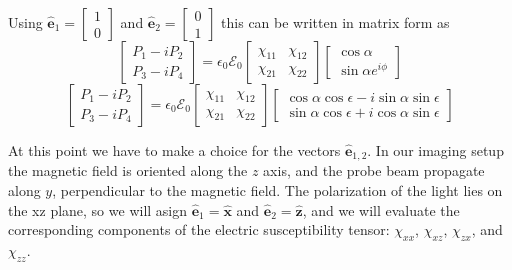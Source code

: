 \documentclass[11pt,letter]{article}
\newcommand{\bv}[1]{\ensuremath{\bm{#1}}}
\newcommand{\efieldo}{\ensuremath{\mathcal{E}_{0}}}
\begin{document}
Using  
$\bv{\hat{e}}_{1} = \left[ \begin{smallmatrix}  1 \\ 0 \end{smallmatrix} \right]$
and 
$\bv{\hat{e}}_{2} = \left[ \begin{smallmatrix}  0 \\ 1 \end{smallmatrix} \right]$
this can be written in matrix form as 
\begin{equation}
 \left[ \begin{matrix}  P_{1}-iP_{2} \\ P_{3}-iP_{4} \end{matrix} \right]
  =  \epsilon_{0}\efieldo 
 \left[ \begin{matrix}
     \chi_{11} & \chi_{12} \\ \chi_{21} & \chi_{22} 
 \end{matrix} \right]
 \left[ \begin{matrix}
      \cos\alpha \\
      \sin\alpha e^{i\phi}
 \end{matrix} \right]
\end{equation}
\begin{equation}
 \left[ \begin{matrix}  P_{1}-iP_{2} \\ P_{3}-iP_{4} \end{matrix} \right]
  =  \epsilon_{0}\efieldo 
 \left[ \begin{matrix}
     \chi_{11} & \chi_{12} \\ \chi_{21} & \chi_{22} 
 \end{matrix} \right]
 \left[ \begin{matrix}
      \cos\alpha \cos \epsilon - i \sin\alpha\sin\epsilon \\
      \sin\alpha \cos\epsilon + i \cos\alpha\sin\epsilon
 \end{matrix} \right]
\end{equation}

At this point we have to make a choice for the vectors $\bv{\hat{e}}_{1,2}$.
In our imaging setup the magnetic field is oriented along the $z$ axis, and the
probe beam propagate along $y$, perpendicular to the magnetic field.   The
polarization of the light lies on the xz plane, so we will asign
$\bv{\hat{e}}_{1} = \bv{\hat{x}}$ and $\bv{\hat{e}}_{2} = \bv{\hat{z}}$, and we
will evaluate the corresponding components of the electric susceptibility
tensor: $\chi_{xx}$, $\chi_{xz}$, $\chi_{zx}$, and $\chi_{zz}$.
\end{document}

